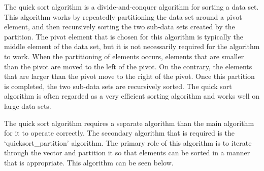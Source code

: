 The quick sort algorithm is a divide-and-conquer algorithm for sorting a data set. This algorithm works by repeatedly partitioning the data set around a pivot element, and then recursively sorting the two sub-data sets
created by the partition. The pivot element that is chosen for this algorithm is typically the middle element of the data set, but it is not necessarily required for the algorithm to work. When the partitioning of elements
occurs, elements that are smaller than the pivot are moved to the left of the pivot. On the contrary, the elements that are larger than the pivot move to the right of the pivot. Once this partition is completed, the two
sub-data sets are recursively sorted. The quick sort algorithm is often regarded as a very efficient sorting algorithm and works well on large data sets.

The quick sort algorithm requires a separate algorithm than the main algorithm for it to operate correctly. The secondary algorithm that is required is the `quicksort\_partition' algorithm. The primary role of this algorithm
is to iterate through the vector and partition it so that elements can be sorted in a manner that is appropriate. This algorithm can be seen below.

